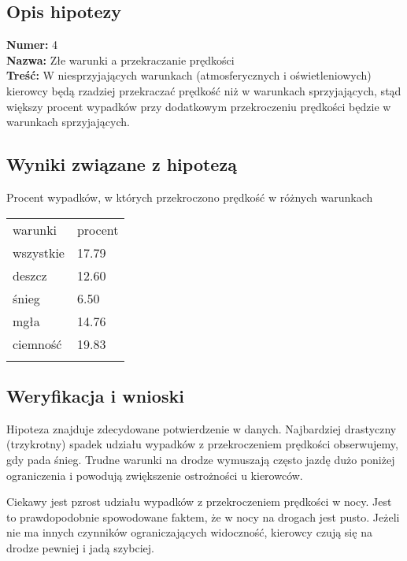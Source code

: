 \subsection{Opis hipotezy}\label{opis-hipotezy}

\textbf{Numer:} 4\\\textbf{Nazwa:} Złe warunki a przekraczanie
prędkości\\\textbf{Treść:} W niesprzyjających warunkach (atmosferycznych
i oświetleniowych) kierowcy będą rzadziej przekraczać prędkość niż w
warunkach sprzyjających, stąd większy procent wypadków przy dodatkowym
przekroczeniu prędkości będzie w warunkach sprzyjających.

\subsection{Wyniki związane z
hipotezą}\label{wyniki-zwiazane-z-hipoteza}

Procent wypadków, w których przekroczono prędkość w różnych warunkach

\begin{longtable}[c]{@{}ll@{}}
\toprule\addlinespace
warunki & procent
\\\addlinespace
\midrule\endhead
wszystkie & 17.79
\\\addlinespace
deszcz & 12.60
\\\addlinespace
śnieg & 6.50
\\\addlinespace
mgła & 14.76
\\\addlinespace
ciemność & 19.83
\\\addlinespace
\bottomrule
\end{longtable}

\subsection{Weryfikacja i wnioski}\label{weryfikacja-i-wnioski}

Hipoteza znajduje zdecydowane potwierdzenie w danych. Najbardziej
drastyczny (trzykrotny) spadek udziału wypadków z przekroczeniem
prędkości obserwujemy, gdy pada śnieg. Trudne warunki na drodze
wymuszają często jazdę dużo poniżej ograniczenia i powodują zwiększenie
ostrożności u kierowców.

Ciekawy jest pzrost udziału wypadków z przekroczeniem prędkości w nocy.
Jest to prawdopodobnie spowodowane faktem, że w nocy na drogach jest
pusto. Jeżeli nie ma innych czynników ograniczających widoczność,
kierowcy czują się na drodze pewniej i jadą szybciej.
